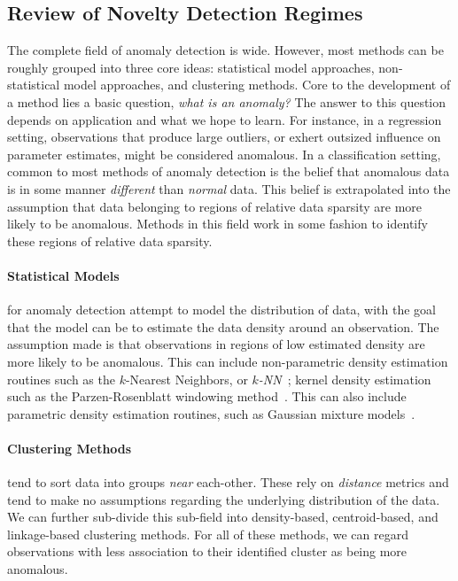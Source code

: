 \subsection{Review of Novelty Detection Regimes}

The complete field of anomaly detection is wide.  However, most methods can be 
    roughly grouped into three core ideas: statistical model approaches, 
    non-statistical model approaches, and clustering methods. Core to the 
    development of a method lies a basic question, \emph{what is an anomaly?}  
    The answer to this question depends on application and what we hope to
    learn.  For instance, in a regression setting, observations that produce 
    large outliers, or exhert outsized influence on parameter estimates, might 
    be considered anomalous.  In a classification setting, common to most 
    methods of anomaly detection is the belief that anomalous data is in some 
    manner \emph{different} than \emph{normal} data. This belief is extrapolated
    into the assumption that data belonging to regions of relative data sparsity
    are more likely to be anomalous.  Methods in this field work in some fashion
     to identify these regions of relative data sparsity.

\paragraph{Statistical Models} for anomaly detection attempt to model the 
    distribution of data, with the goal that the model can be to estimate the 
    data density around an observation. The assumption made is that observations
    in regions of low estimated density are more likely to be anomalous.  This 
    can include non-parametric density estimation routines such as the 
    $k$-Nearest Neighbors, or \emph{$k$-NN}~\citep{kramer2013}; kernel density 
    estimation such as the Parzen-Rosenblatt windowing 
    method~\citep{parzen1962,rosenblatt1956}.  This can also include parametric 
    density estimation routines, such as Gaussian mixture 
    models~\citep{mcnicholas2010}.

\paragraph{Clustering Methods} tend to sort data into groups \emph{near} 
    each-other.  These rely on \emph{distance} metrics and tend to make no 
    assumptions regarding the underlying distribution of the data.  We can 
    further sub-divide this sub-field into density-based, centroid-based, and 
    linkage-based clustering methods.  For all of these methods, we can regard 
    observations with less association to their identified cluster as being more
    anomalous.

